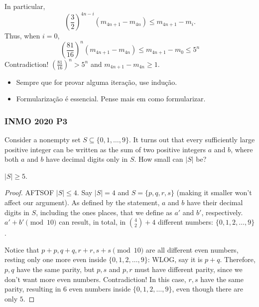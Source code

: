 In particular,
\[
	\left(\frac{3}{2}\right)^{4n-i}(m_{4n+1}-m_{4n}) \le m_{4n+1}-m_i.
\]
Thus, when $i=0$,
\[
	\left(\frac{81}{16}\right)^n(m_{4n+1}-m_{4n}) \le m_{4n+1}-m_0 \le 5^n
\]
Contradiction! $\left(\frac{81}{16}\right)^n > 5^n$ and $m_{4n+1}-m_{4n} \ge 1$.

\begin{insight}
	\begin{itemize}
		\item Sempre que for provar alguma iteração, use indução.
		\item Formularização é essencial. Pense mais em como formularizar.
	\end{itemize}
\end{insight}

\clearpage

\subsubsection{INMO 2020 P3}

\begin{problem}
Consider a nonempty set $S \subseteq \{0, 1, \dots, 9\}$.
It turns out that every sufficiently large positive integer
can be written as the sum of two positive integers $a$ and $b$,
where both $a$ and $b$ have decimal digits only in $S$.
How small can $|S|$ be?
\end{problem}

\begin{claim}
	$|S| \ge 5$.
\end{claim}
\begin{proof}
	AFTSOF $|S| \le 4$. Say $|S|=4$ and $S=\{p,q,r,s\}$ (making it smaller won't affect our argument).
	As defined by the statement, $a$ and $b$ have their decimal digits in $S$,
	including the ones places, that we define as $a'$ and $b'$, respectively. $a'+b' \pmod{10}$
	can result, in total, in $\binom{4}{2}+4$ different numbers: $\{0,1,2, \dots,9\}$.

	Notice that $p+p,q+q,r+r,s+s \pmod{10}$ are all different even numbers, resting only one more even inside
	$\{0,1,2, \dots,9\}$: WLOG, say it is $p+q$. Therefore, $p,q$ have the same parity, but $p,s$ and $p,r$ must
	have different parity, since we don't want more even numbers. Contradiction! In this case, $r,s$
	have the same parity, resulting in $6$ even numbers inside $\{0,1,2, \dots,9\}$, even though there are only $5$.
\end{proof}


